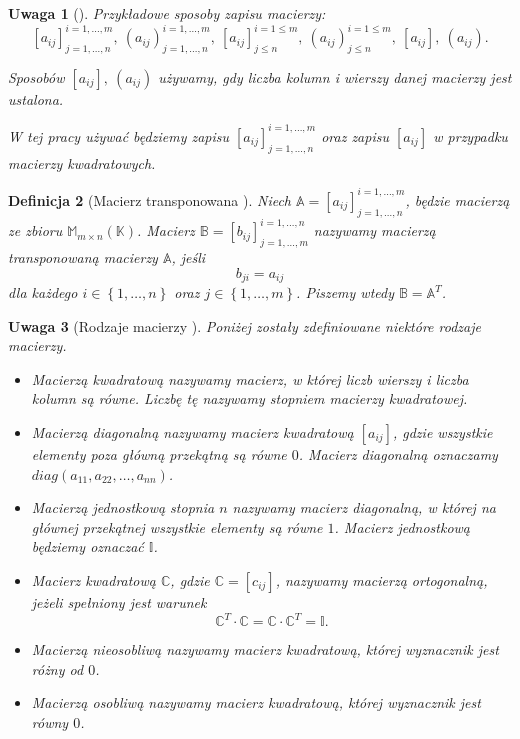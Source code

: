 \documentclass[12pt,a4paper]{report}
\newtheorem{df}{Definicja}[chapter]
\newtheorem{uwaga}[df]{Uwaga}
\newcommand{\set}[1]{\left\lbrace {#1} \right\rbrace}
\newcommand{\setK}{\mathbb{K}}
\begin{document}
\begin{uwaga}[{\citep[Sec 8.1]{alzega}}]
Przykładowe sposoby zapisu macierzy:
$$
[a_{ij}]_{j = 1, \ldots, n}^{i = 1, \ldots , m}, \: (a_{ij})_{j = 1, \ldots, n}^{i = 1, \ldots , m}, \: [a_{ij}]_{j \leq n}^{i = 1 \leq m}, \: (a_{ij})_{j \leq n}^{i = 1 \leq m}, \: [a_{ij}], \: (a_{ij}).
$$

Sposobów $[a_{ij}], \: (a_{ij})$ używamy, gdy liczba kolumn i wierszy danej macierzy jest ustalona. 

W tej pracy używać będziemy zapisu $[a_{ij}]_{j = 1, \ldots, n}^{i = 1, \ldots , m}$ oraz zapisu $[a_{ij}]$ w przypadku macierzy kwadratowych.
\end{uwaga}

\begin{df}[Macierz transponowana {\citep[Sec 8.1 ]{alzega}}]
Niech $\mathbb{A} = [a_{ij}]_{j = 1, \ldots, n}^{i = 1, \ldots , m}$, będzie macierzą ze zbioru $\mathbb{M}_{m \times n}(\setK)$.
Macierz $\mathbb{B} = [b_{ij}]_{j = 1, \ldots, m}^{i = 1, \ldots , n}$ nazywamy macierzą transponowaną macierzy $\mathbb{A}$, jeśli 
$$
b_{ji} = a_{ij}
$$ 
dla każdego $i \in \set{1, \ldots, n}$ oraz $j \in \set{1, \ldots ,m}$. Piszemy wtedy $\mathbb{B} = \mathbb{A}^T$.
\end{df}

\begin{uwaga}[Rodzaje macierzy {\citep[Sec 8.1, Sec 10.4]{alzega}}]
Poniżej zostały zdefiniowane niektóre rodzaje macierzy.
\begin{itemize}
\item Macierzą kwadratową nazywamy macierz, w której liczb wierszy i liczba kolumn są równe. Liczbę tę nazywamy stopniem macierzy kwadratowej.
\item Macierzą diagonalną nazywamy macierz kwadratową $[a_{ij}]$, gdzie wszystkie elementy poza główną przekątną są równe $0$. Macierz diagonalną oznaczamy 
\\$diag(a_{11}, a_{22}, \ldots , a_{nn})$.
\item Macierzą jednostkową stopnia $n$ nazywamy macierz diagonalną, w której na głównej przekątnej wszystkie elementy są równe $1$. Macierz jednostkową będziemy oznaczać $\mathbb{I}$.
\item Macierz kwadratową $\mathbb{C}$, gdzie $\mathbb{C} = [c_{ij}]$, nazywamy macierzą ortogonalną, jeżeli spełniony jest warunek
$$
\mathbb{C}^T \cdot \mathbb{C} = \mathbb{C} \cdot \mathbb{C}^T = \mathbb{I}. 
$$
\item Macierzą nieosobliwą nazywamy macierz kwadratową, której wyznacznik jest różny od $0$.
\item Macierzą osobliwą nazywamy macierz kwadratową, której wyznacznik jest równy $0$.
\end{itemize}
\end{uwaga}
\end{document}
